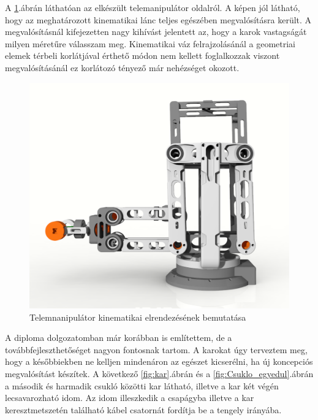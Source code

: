 A \ref{fig:Telemnanipulátor_kinematika}.ábrán láthatóan az elkészült telemanipulátor oldalról. A képen jól látható, hogy az meghatározott kinematikai lánc teljes egészében megvalósításra került. A megvalósításnál kifejezetten nagy kihívást jelentett az, hogy a karok vastagságát milyen méretűre válasszam meg. Kinematikai váz felrajzolásánál a geometriai elemek térbeli korlátjával érthető módon nem kellett foglalkozzak viszont megvalósításánál ez korlátozó tényező már nehézséget okozott.

\begin{figure}[!ht]
\centering
\includegraphics[width=130mm, keepaspectratio]{figures/Diploma_CAD/creo2.png}
\caption{Telemnanipulátor kinematikai elrendezésének bemutatása}
\label{fig:Telemnanipulátor_kinematika}
\end{figure}

A diploma dolgozatomban már korábban is említettem, de a továbbfejleszthetőséget nagyon fontosnak tartom. A karokat úgy terveztem meg, hogy a későbbiekben ne kelljen mindenáron az egészet kicserélni, ha új koncepciós megvalósítást készítek. A következő \ref{fig:kar}.ábrán és a \ref{fig:Csuklo_egyedul}.ábrán a második és harmadik csukló közötti kar látható, illetve a kar két végén lecsavarozható idom. Az idom illeszkedik a csapágyba illetve a kar keresztmetszetén található kábel csatornát fordítja be a tengely irányába.


